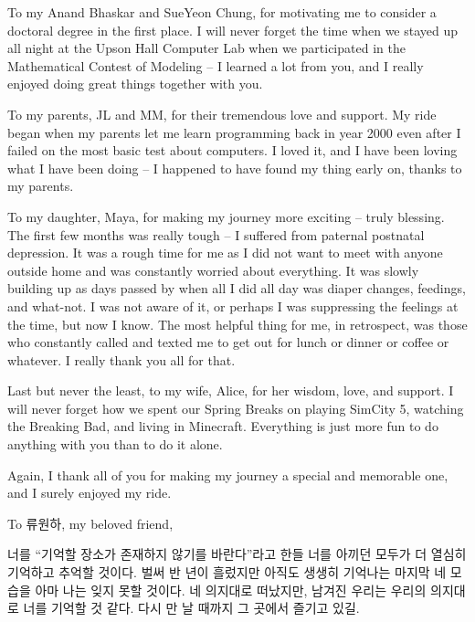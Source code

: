 To my Anand Bhaskar and SueYeon Chung, for motivating me to consider a doctoral degree in the first place. I will never forget the time when we stayed up all night at the Upson Hall Computer Lab when we participated in the Mathematical Contest of Modeling -- I learned a lot from you, and I really enjoyed doing great things together with you. 

To my parents, JL and MM, for their tremendous love and support. My ride began when my parents let me learn programming back in year 2000 even after I failed on the most basic test about computers. I loved it, and I have been loving what I have been doing -- I happened to have found my thing early on, thanks to my parents. 

To my daughter, Maya, for making my journey more exciting -- truly blessing. The first few months was really tough -- I suffered from paternal postnatal depression. It was a rough time for me as I did not want to meet with anyone outside home and was constantly worried about everything. It was slowly building up as days passed by when all I did all day was diaper changes, feedings, and what-not. I was not aware of it, or perhaps I was suppressing the feelings at the time, but now I know. The most helpful thing for me, in retrospect, was those who constantly called and texted me to get out for lunch or dinner or coffee or whatever. I really thank you all for that.

Last but never the least, to my wife, Alice, for her wisdom, love, and support. I will never forget how we spent our Spring Breaks on playing SimCity 5, watching the Breaking Bad, and living in Minecraft. Everything is just more fun to do anything with you than to do it alone. 

Again, I thank all of you for making my journey a special and memorable one, and I surely enjoyed my ride.


To 류원하, my beloved friend,

너를 ``기억할 장소가 존재하지 않기를 바란다''라고 한들
너를 아끼던 모두가 더 열심히 기억하고 추억할 것이다.
벌써 반 년이 흘렀지만 아직도 생생히 기억나는 마지막 네 모습을 아마 나는 잊지 못할 것이다.
네 의지대로 떠났지만, 남겨진 우리는 우리의 의지대로 너를 기억할 것 같다. 
다시 만 날 때까지 그 곳에서 즐기고 있길.

